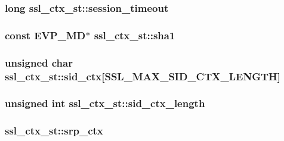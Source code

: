\hypertarget{structssl__ctx__st_a7b165f0e9fbde0499dedb660cdf0d756}{
\subsubsection[{session\-\_\-timeout}]{\setlength{\rightskip}{0pt plus 5cm}long ssl\-\_\-ctx\-\_\-st\-::session\-\_\-timeout}}\label{structssl__ctx__st_a7b165f0e9fbde0499dedb660cdf0d756}
\hypertarget{structssl__ctx__st_ae6ea4c79f3be1d3c103b290e08009204}{
\subsubsection[{sha1}]{\setlength{\rightskip}{0pt plus 5cm}const E\-V\-P\-\_\-\-M\-D$\ast$ ssl\-\_\-ctx\-\_\-st\-::sha1}}\label{structssl__ctx__st_ae6ea4c79f3be1d3c103b290e08009204}
\hypertarget{structssl__ctx__st_a92f94c2a4612e04ec3c075c76aae5553}{
\subsubsection[{sid\-\_\-ctx}]{\setlength{\rightskip}{0pt plus 5cm}unsigned char ssl\-\_\-ctx\-\_\-st\-::sid\-\_\-ctx\mbox{[}{\bf S\-S\-L\-\_\-\-M\-A\-X\-\_\-\-S\-I\-D\-\_\-\-C\-T\-X\-\_\-\-L\-E\-N\-G\-T\-H}\mbox{]}}}\label{structssl__ctx__st_a92f94c2a4612e04ec3c075c76aae5553}
\hypertarget{structssl__ctx__st_a59afab8285fbc901d590ab6edaa75bd0}{
\subsubsection[{sid\-\_\-ctx\-\_\-length}]{\setlength{\rightskip}{0pt plus 5cm}unsigned int ssl\-\_\-ctx\-\_\-st\-::sid\-\_\-ctx\-\_\-length}}\label{structssl__ctx__st_a59afab8285fbc901d590ab6edaa75bd0}
\hypertarget{structssl__ctx__st_a337f1046f4778a8835a72230f2c1f138}{
\subsubsection[{srp\-\_\-ctx}]{ ssl\-\_\-ctx\-\_\-st\-::srp\-\_\-ctx}}\label{structssl__ctx__st_a337f1046f4778a8835a72230f2c1f138}
